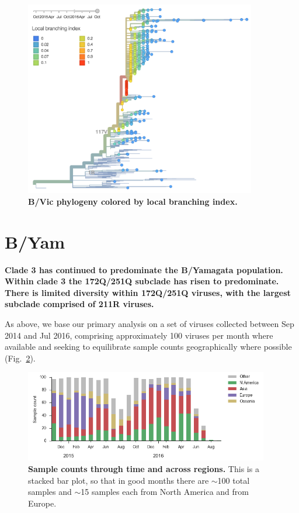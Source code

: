\documentclass[11pt,oneside,letterpaper]{article}
\begin{document}
\begin{figure}[H]
	\centering
	\includegraphics[width=0.9\textwidth]{../figures/sep-2016/Vic_LBI.png}
	\caption{\textbf{B/Vic phylogeny colored by local branching index.}
	}
	\label{Vic_LBI}
\end{figure}

\clearpage
\pagebreak

\section*{B/Yam}

\textbf{Clade 3 has continued to predominate the B/Yamagata population. Within clade 3 the 172Q/251Q subclade has risen to predominate. There is limited diversity within 172Q/251Q viruses, with the largest subclade comprised of 211R viruses.}

As above, we base our primary analysis on a set of viruses collected between Sep 2014 and Jul 2016, comprising approximately 100 viruses per month where available and seeking to equilibrate sample counts geographically where possible (Fig.\ \ref{Yam_counts}).

\begin{figure}[H]
	\centering
	\includegraphics[width=0.95\textwidth]{../figures/sep-2016/Yam_counts.png}
	\caption{\textbf{Sample counts through time and across regions.}
	This is a stacked bar plot, so that in good months there are $\sim$100 total samples and $\sim$15 samples each from North America and from Europe.
	}
	\label{Yam_counts}
\end{figure}
\end{document}

